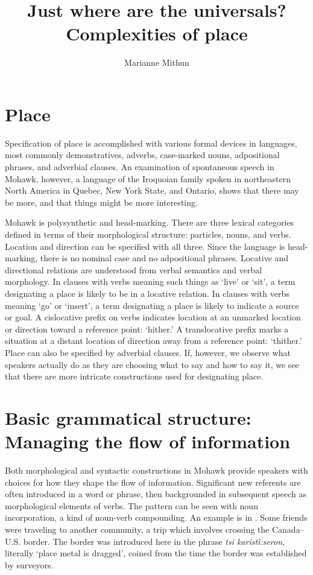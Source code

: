 \documentclass[output=paper,colorlinks,citecolor=brown]{langscibook}
\author{Marianne Mithun\orcid{}\affiliation{University of California, Santa Barbara}}
\title{Just where are the universals? Complexities of place}
\begin{document}
\maketitle

\section{Place}

Specification of place is accomplished with various formal devices in languages, most commonly demonstratives, adverbs, case-marked nouns, adpositional phrases, and adverbial clauses. An examination of spontaneous speech in Mohawk, however, a language of the Iroquoian family spoken in northeastern North America in Quebec, New York State, and Ontario, shows that there may be more, and that things might be more interesting.

Mohawk is polysynthetic and head-marking. There are three lexical categories defined in terms of their morphological structure: particles, nouns, and verbs. Location and direction can be specified with all three. Since the language is head-marking, there is no nominal case and no adpositional phrases. Locative and directional relations are understood from verbal semantics and verbal morphology. In clauses with verbs meaning such things as `live' or `sit', a term designating a place is likely to be in a locative relation. In clauses with verbs meaning `go' or `insert', a term designating a place is likely to indicate a source or goal. A cislocative prefix on verbs indicates location at an unmarked location or direction toward a reference point: `hither.' A translocative prefix marks a situation at a distant location of direction away from a reference point: `thither.' Place can also be specified by adverbial clauses. If, however, we observe what speakers actually do as they are choosing what to say and how to say it, we see that there are more intricate constructions used for designating place.

\section{Basic grammatical structure: Managing the flow of information}
Both morphological and syntactic constructions in Mohawk provide speakers with choices for how they shape the flow of information. Significant new referents are often introduced in a word or phrase, then backgrounded in subsequent speech as morphological elements of verbs. The pattern can be seen with noun incorporation, a kind of noun-verb compounding. An example is in . Some friends were traveling to another community, a trip which involves crossing the Canada--U.S. border. The border was introduced here in the phrase \emph{tsi karistì:seron}, literally `place metal is dragged', coined from the time the border was established by surveyors.
\end{document}

